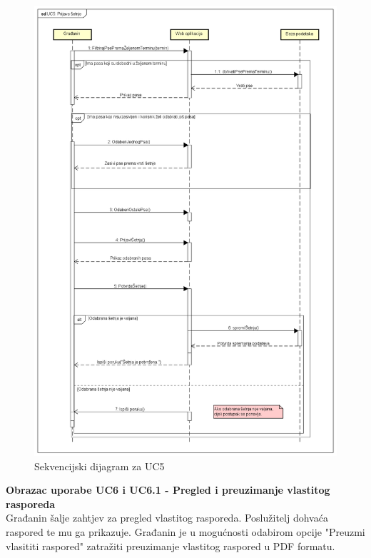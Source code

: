 				\begin{figure}[H]
					\includegraphics[width=\linewidth]{slike/SEK-5.png}
					\centering
					\caption{Sekvencijski dijagram za UC5}
					\label{fig:sek-5}
				\end{figure}
			
				\pagebreak
				\noindent\textbf{Obrazac uporabe UC6 i UC6.1 - Pregled i preuzimanje vlastitog rasporeda}\\
				
				\noindent Građanin šalje zahtjev za pregled vlastitog rasporeda. Poslužitelj dohvaća raspored 
				te mu ga prikazuje. Građanin je u mogućnosti odabirom opcije "Preuzmi vlasititi raspored" 
				zatražiti preuzimanje vlastitog raspored u PDF formatu.
				
